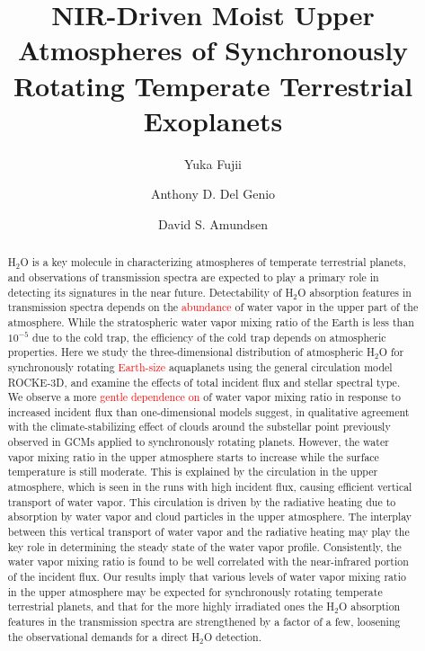 \documentclass[11pt,numberedappendix,twocolappendix,]{emulateapj}
\def\addYF#1{\textcolor{red}{#1}}
\begin{document}

\title{NIR-Driven Moist Upper Atmospheres of Synchronously Rotating Temperate Terrestrial Exoplanets}

\author{Yuka Fujii}

\author{Anthony D. Del Genio}

\author{David S. Amundsen}


\begin{abstract}
%
H$_2$O is a key molecule in characterizing atmospheres of temperate terrestrial planets, and observations of transmission spectra are expected to play a primary role in detecting its signatures in the near future. 
Detectability of H$_2$O absorption features in transmission spectra depends on the \addYF{abundance} of water vapor in the upper part of the atmosphere. 
While the stratospheric water vapor mixing ratio of the Earth is less than $10^{-5}$ due to the cold trap, the efficiency of the cold trap depends on atmospheric properties. 
Here we study the three-dimensional distribution of atmospheric H$_2$O for synchronously rotating \addYF{Earth-size} aquaplanets using the general circulation model ROCKE-3D, and examine the effects of total incident flux and stellar spectral type.  
We observe a more \addYF{gentle dependence on} of water vapor mixing ratio in response to increased incident flux than one-dimensional models suggest, in qualitative agreement with the climate-stabilizing effect of clouds around the substellar point previously observed in GCMs applied to synchronously rotating planets. 
However, the water vapor mixing ratio in the upper atmosphere starts to increase while the surface temperature is still moderate. 
This is explained by the circulation in the upper atmosphere, which is seen in the runs with high incident flux, causing efficient vertical transport of water vapor. 
This circulation is driven by the radiative heating due to absorption by water vapor and cloud particles in the upper atmosphere. 
The interplay between this vertical transport of water vapor and the radiative heating may play the key role in determining the steady state of the water vapor profile. 
Consistently, the water vapor mixing ratio is found to be well correlated with the near-infrared portion of the incident flux. 
Our results imply that various levels of water vapor mixing ratio in the upper atmosphere may be expected for synchronously rotating temperate terrestrial planets, and that for the more highly irradiated ones the H$_2$O absorption features in the transmission spectra are strengthened by a factor of a few, loosening the observational demands for a direct H$_2$O detection. 
%
\end{abstract}
\end{document}
